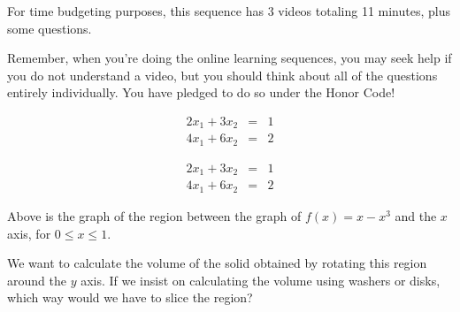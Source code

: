 




For time budgeting purposes, this sequence has 3 videos totaling 11 minutes, 
plus some questions.  

Remember, when you're doing the online learning sequences, you may seek help if you 
do not understand a video, but you should think about all of the questions 
entirely individually.  You have pledged to do so under the Honor Code!  



\begin{eqnarray*}
2x_1 + 3x_2 & = & 1 \\
4x_1 + 6x_2 & = & 2 
\end{eqnarray*}

\endedxtext

\endedxvertical







\begin{eqnarray*}
2x_1 + 3x_2 & = & 1 \\
4x_1 + 6x_2 & = & 2 
\end{eqnarray*}

Above is the graph of the region between the graph of $f(x) = x-x^3$ and the $x$ axis, for $0\le x \le 1$.  

We want to calculate the volume of the solid obtained by rotating this region around the
$y$ axis.  If we insist on calculating the volume using washers or disks, which way would
we have to slice the region?  



\endedxproblem


\endedxvertical

